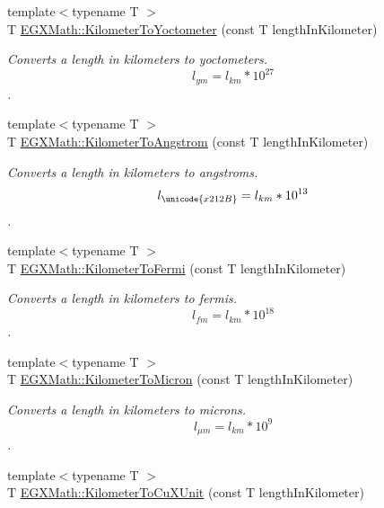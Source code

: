 \begin{DoxyCompactItemize}
{\footnotesize template$<$typename T $>$ }\\T \mbox{\hyperlink{group___e_g_x_math-_conversions-_length_conversions-_s_i-_kilometer-_s_i_gaf03c100edda155de40290d8c3e155a27}{E\+G\+X\+Math\+::\+Kilometer\+To\+Yoctometer}} (const T length\+In\+Kilometer)
\begin{DoxyCompactList}\small\item\em Converts a length in kilometers to yoctometers. \[ l_{ym}=l_{km} * 10^{27} \]. \end{DoxyCompactList}\item 
{\footnotesize template$<$typename T $>$ }\\T \mbox{\hyperlink{group___e_g_x_math-_conversions-_length_conversions-_s_i-_kilometer-_non-_s_i_ga415a412a1b03916d6071a206a3318035}{E\+G\+X\+Math\+::\+Kilometer\+To\+Angstrom}} (const T length\+In\+Kilometer)
\begin{DoxyCompactList}\small\item\em Converts a length in kilometers to angstroms. \[ l_{\unicode{x212B}}=l_{km} * 10^{13} \]. \end{DoxyCompactList}\item 
{\footnotesize template$<$typename T $>$ }\\T \mbox{\hyperlink{group___e_g_x_math-_conversions-_length_conversions-_s_i-_kilometer-_non-_s_i_ga9c38d019deb86a60173d5d2b65a1ef57}{E\+G\+X\+Math\+::\+Kilometer\+To\+Fermi}} (const T length\+In\+Kilometer)
\begin{DoxyCompactList}\small\item\em Converts a length in kilometers to fermis. \[ l_{fm}=l_{km} * 10^{18} \]. \end{DoxyCompactList}\item 
{\footnotesize template$<$typename T $>$ }\\T \mbox{\hyperlink{group___e_g_x_math-_conversions-_length_conversions-_s_i-_kilometer-_non-_s_i_gae662bafe0d1fc36276a336fd969307a0}{E\+G\+X\+Math\+::\+Kilometer\+To\+Micron}} (const T length\+In\+Kilometer)
\begin{DoxyCompactList}\small\item\em Converts a length in kilometers to microns. \[ l_{\mu m}=l_{km} * 10^{9} \]. \end{DoxyCompactList}\item 
{\footnotesize template$<$typename T $>$ }\\T \mbox{\hyperlink{group___e_g_x_math-_conversions-_length_conversions-_s_i-_kilometer-_non-_s_i_ga0614eb6a9e8bf1a9ba6cf51121f22083}{E\+G\+X\+Math\+::\+Kilometer\+To\+Cu\+X\+Unit}} (const T length\+In\+Kilometer)

\end{DoxyCompactItemize}

